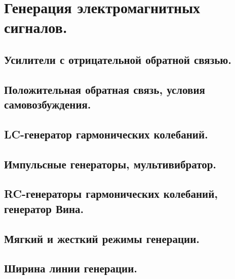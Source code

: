 \documentclass[../main/main.tex]{subfiles}
\begin{document}
\section{Генерация электромагнитных сигналов.}

\subsection{Усилители с отрицательной обратной связью.}

\subsection{Положительная обратная связь, условия самовозбуждения.}

\subsection{LC-генератор гармонических колебаний.}

\subsection{Импульсные генераторы, мультивибратор.}

\subsection{RC-генераторы гармонических колебаний, генератор Вина.}

\subsection{Мягкий и жесткий режимы генерации.}

\subsection{Ширина линии генерации.}
\end{document}
